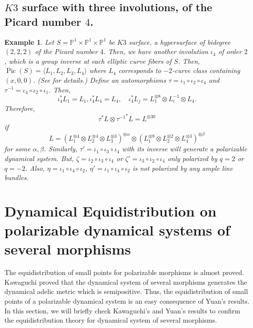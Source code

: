 \documentclass[11pt,letterpaper]{amsart}
\newtheorem{ex}[thm]{Example}
\begin{document}
    \subsection{$K3$ surface with three involutions, of the Picard number $4$.}
    \begin{ex}
    Let $S = {\mathbb{P}}^1 \times {\mathbb{P}}^1 \times {\mathbb{P}}^1$ be $K3$ surface, a hypersurface of bidegree $(2,2,2)$ of the Picard number $4$. Then, we have another involution $\iota_4$ of order $2$, which is a group inverse at each elliptic curve fibers of $S$. Then, ${\operatorname{Pic}}(S) = \langle L_1, L_2, L_3, L_4 \rangle$ where $L_4$ corresponds to $-2$-curve class containing $(x,0,0)$. (See \cite{BM} for details.) Define an automorphisms $\tau = \iota_1 \circ \iota_2 \circ \iota_4$ and $\tau^{-1} = \iota_4 \circ \iota_2 \circ \iota_1$. Then,
    \[
    \iota_4^*L_1 = L_1, \iota_4^*L_4 = L_4, \quad  \iota_4^*L_j = L_1^{\otimes 8} \otimes L_i^{-1} \otimes L_4.
    \]
    Therefore,
    \[
    \tau^*L \otimes {\tau^{-1}}^* L = L^{\otimes 30}
    \]
    if
    \[L =  (L_1^{\otimes 4} \otimes  L_2^{\otimes  4} \otimes L_3^{\otimes 3})^{\otimes \alpha} \otimes
     (L_1^{\otimes 8} \otimes  L_2^{\otimes  2} \otimes L_4^{\otimes 3})^{\otimes \beta}
     \]
     for some $\alpha, \beta$. Similarly, $\tau' = \iota_1 \circ \iota_3 \circ \iota_4$ with its inverse
     will generate a polarizable dynamical system. But, $\zeta = \iota_2 \circ \iota_3 \circ \iota_4$ or $\zeta' = \iota_3 \circ \iota_2 \circ \iota_4$ only polarized by $q=2$ or $q=-2$. Also, $\eta = \iota_1 \circ \iota_4\circ \iota_2$, $\eta' = \iota_1 \circ \iota_4 \circ \iota_2$ is not polarized by any ample line bundles.
    \end{ex}

\section{Dynamical Equidistribution on polarizable dynamical systems of several morphisms}

    The equidistribution of small points for polarizable morphisms is almost proved. Kawaguchi proved that the dynamical system of several morphisms generates the dynamical adelic metric which is semipositive.  Thus, the equidistribution of small points of a polarizable dynamical system is an easy consequence of Yuan's results. In this section, we will briefly check Kawaguchi's and Yuan's results to confirm the equidistribution theory for dynamical system of several morphisms.
\end{document}
